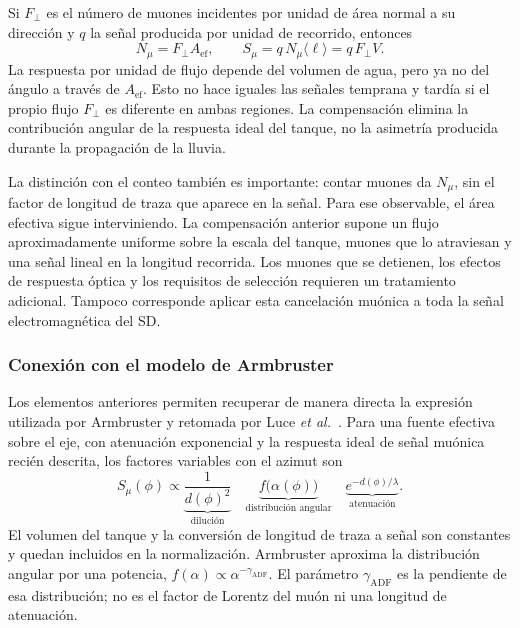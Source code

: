 Si $F_\perp$ es el número de muones incidentes por unidad de área normal a su dirección y $q$ la señal producida por unidad de recorrido, entonces
\begin{equation}
N_\mu=F_\perp A_{\mathrm{ef}},
\qquad
S_\mu=q\,N_\mu\langle\ell\rangle
=q\,F_\perp V.
\label{eq:senal_muonica_tanque}
\end{equation}
La respuesta por unidad de flujo depende del volumen de agua, pero ya no del ángulo a través de $A_{\mathrm{ef}}$. Esto no hace iguales las señales temprana y tardía si el propio flujo $F_\perp$ es diferente en ambas regiones. La compensación elimina la contribución angular de la respuesta ideal del tanque, no la asimetría producida durante la propagación de la lluvia.

La distinción con el conteo también es importante: contar muones da $N_\mu$, sin el factor de longitud de traza que aparece en la señal. Para ese observable, el área efectiva sigue interviniendo. La compensación anterior supone un flujo aproximadamente uniforme sobre la escala del tanque, muones que lo atraviesan y una señal lineal en la longitud recorrida. Los muones que se detienen, los efectos de respuesta óptica y los requisitos de selección requieren un tratamiento adicional. Tampoco corresponde aplicar esta cancelación muónica a toda la señal electromagnética del SD.

\subsubsection{Conexión con el modelo de Armbruster}
\label{subsubsec:conexion_armbruster}

Los elementos anteriores permiten recuperar de manera directa la expresión utilizada por Armbruster y retomada por Luce \textit{et al.}~\cite{Armbruster2018,Luce_ICRC2021}. Para una fuente efectiva sobre el eje, con atenuación exponencial y la respuesta ideal de señal muónica recién descrita, los factores variables con el azimut son
\begin{equation}
S_\mu(\phi)\propto
\underbrace{\frac{1}{d(\phi)^2}}_{\text{dilución}}
\quad\underbrace{f\bigl(\alpha(\phi)\bigr)}_{\text{distribución angular}}
\quad\underbrace{e^{-d(\phi)/\lambda}}_{\text{atenuación}}.
\label{eq:producto_armbruster}
\end{equation}
El volumen del tanque y la conversión de longitud de traza a señal son constantes y quedan incluidos en la normalización. Armbruster aproxima la distribución angular por una potencia, $f(\alpha)\propto\alpha^{-\gamma_{\mathrm{ADF}}}$. El parámetro $\gamma_{\mathrm{ADF}}$ es la pendiente de esa distribución; no es el factor de Lorentz del muón ni una longitud de atenuación.

